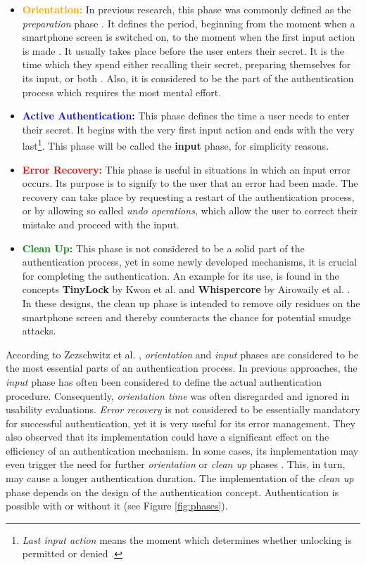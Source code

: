 \begin{itemize}
    \item \textbf{\textcolor{orange}{Orientation:}} In previous research, this phase was commonly defined as the \textit{preparation} phase . It defines the period, beginning from the moment when a smartphone screen is switched on, to the moment when the first input action is made . It usually takes place before the user enters their secret. It is the time which they spend either recalling their secret, preparing themselves for its input, or both . Also, it is considered to be the part of the authentication process which requires the most mental effort.  
    \item \textbf{\textcolor{blue}{Active Authentication:}} This phase defines the time a user needs to enter their secret. It begins with the very first input action and ends with the very last\footnote{ \textit{Last input action} means the moment which determines whether unlocking is permitted or denied \cite{Zezschwitz}.}. This phase will be called the \textbf{input} phase, for simplicity reasons.
    \item \textbf{\textcolor{red}{Error Recovery:}} This phase is useful in situations in which an input error occurs. Its purpose is to signify to the user that an error had been made. The recovery can take place by requesting a restart of the authentication process, or by allowing so called \textit{undo operations}, which allow the user to correct their mistake and proceed with the input. 
    \item \textbf{\textcolor{green}{Clean Up:}} This phase is not considered to be a solid part of the authentication process, yet in some newly developed mechanisms, it is crucial for completing the authentication. An example for its use, is found in the concepts \textbf{TinyLock} by Kwon et al. \cite{kwon} and \textbf{Whispercore} by Airowaily et al. \cite{Airowaily}. In these designs, the clean up phase is intended to remove oily residues on the smartphone screen and thereby counteracts the chance for potential smudge attacks. 
\end{itemize}

According to Zezschwitz et al. \cite{Zezschwitz}, \textit{orientation} and \textit{input} phases are considered to be the most essential parts of an authentication process. In previous approaches, the \textit{input} phase has often been considered to define the actual authentication procedure. Consequently, \textit{orientation time} was often disregarded and ignored in usability evaluations. \textit{Error recovery} is not  considered to be essentially mandatory for successful authentication, yet it is very useful for its error management. They also observed that its implementation could have a significant effect on the efficiency of an authentication mechanism. In some cases, its implementation may even trigger the need for further \textit{orientation} or \textit{clean up} phases \cite{Zezschwitz}. This, in turn, may cause a longer authentication duration. The implementation of the \textit{clean up} phase depends on the design of the authentication concept. Authentication is possible with or without it (see Figure \ref{fig:phases}). \\


